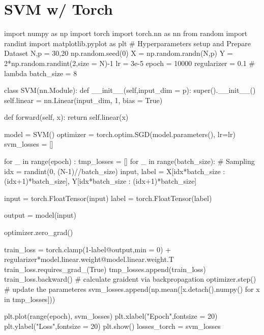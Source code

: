 \documentclass[10pt]{article}
\begin{document}
\section{SVM w/ Torch}
\begin{python}
import numpy as np
import torch
import torch.nn as nn
from random import randint
import matplotlib.pyplot as plt
# Hyperparameters setup and Prepare Dataset
N,p = 30,20
np.random.seed(0)
X = np.random.randn(N,p)
Y = 2*np.random.randint(2,size = N)-1
lr = 3e-5
epoch = 10000
regularizer = 0.1 # lambda
batch_size = 8

class SVM(nn.Module):
    def __init__(self,input_dim = p):
        super().__init__()
        self.linear = nn.Linear(input_dim, 1, bias = True)
    
    def forward(self, x):
        return self.linear(x)

model = SVM()
optimizer = torch.optim.SGD(model.parameters(), lr=lr) 
svm_losses = []

for _ in range(epoch) :
    tmp_losses = []
    for _ in range(batch_size):
        # Sampling
        idx = randint(0, (N-1)//batch_size)
        input, label = X[idx*batch_size : (idx+1)*batch_size], Y[idx*batch_size : (idx+1)*batch_size]
        
        input = torch.FloatTensor(input)
        label = torch.FloatTensor(label)

        output = model(input)

        optimizer.zero_grad()

        train_loss = torch.clamp(1-label@output,min = 0) + regularizer*model.linear.weight@model.linear.weight.T
        train_loss.requires_grad_(True)
        tmp_losses.append(train_loss)
        train_loss.backward() # calculate graident via backpropagation
        optimizer.step() # update the parameteres
    svm_losses.append(np.mean([x.detach().numpy() for x in tmp_losses]))

plt.plot(range(epoch), svm_losses)
plt.xlabel("Epoch",fontsize = 20)
plt.ylabel("Loss",fontsize = 20)
plt.show()
losses_torch = svm_losses
\end{python}
\end{document}
